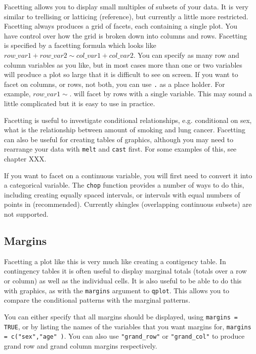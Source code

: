 Facetting allows you to display small multiples of subsets of your data.  It is very similar to trellising or latticing (reference), but currently a little more restricted.  Facetting always produces a grid of facets, each containing a single plot.  You have control over how the grid is broken down into columns and rows.  Facetting is specified by a facetting formula which looks like $row\_var1 + row\_var2 \sim col\_var1 + col\_var2$.  You can specify as many row and column variables as you like, but in most cases more than one or two variables will produce a plot so large that it is difficult to see on screen.  If you want to facet on columns, or rows, not both, you can use {\tt .} as a place holder.  For example, $row\_var1 \sim .$ will facet by rows with a single variable.  This may sound a little complicated but it is easy to use in practice.

Facetting is useful to investigate conditional relationships, e.g. conditional on sex, what is the relationship between amount of smoking and lung cancer.  Facetting can also be useful for creating tables of graphics, although you may need to rearrange your data with {\tt melt} and {\tt cast} first.  For some examples of this, see chapter XXX.

If you want to facet on a continuous variable, you will first need to convert it into a categorical variable.  The {\tt chop} function provides a number of ways to do this, including creating equally spaced intervals, or intervals with equal numbers of points in (recommended).  Currently shingles (overlapping continuous subsets) are not supported.  

\subsection{Margins}\label{sub:margins}

Facetting a plot like this is very much like creating a contigency table.  In contingency tables it is often useful to display marginal totals (totals over a row or column) as well as the individual cells.  It is also useful to be able to do this with graphics, as with the {\tt margins} argument to {\tt qplot}.  This allows you to compare the conditional patterns with the marginal patterns.

You can either specify that all margins should be displayed, using {\tt margins = TRUE}, or by listing the names of the variables that you want margins for, {\tt margins = c("sex","age" )}.  You can also use {\tt "grand\_row"} or {\tt "grand\_col"} to produce grand row and grand column margins respectively.

